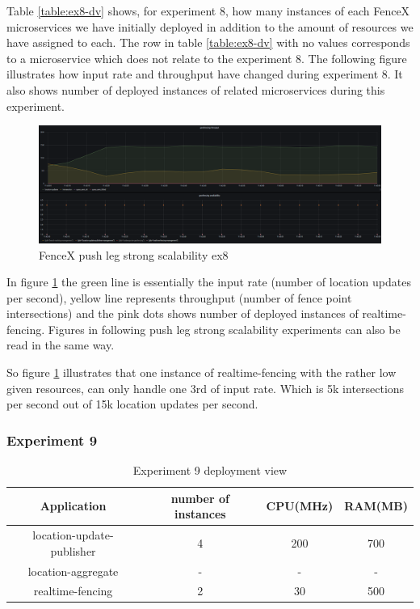 \documentclass[a4]{report}
\begin{document}
    Table \ref{table:ex8-dv} shows, for experiment 8, how many instances of each FenceX microservices we have initially
    deployed in addition to the amount of resources we have assigned to each.
    The row in table \ref{table:ex8-dv} with no values corresponds to a microservice which does not relate to the
    experiment 8.
    The following figure illustrates how input rate and throughput have changed during experiment 8.
    It also shows number of deployed instances of related microservices during this experiment.

    \begin{figure}[h!]
        \centering
        \caption{FenceX push leg strong scalability ex8}
        \label{fig:ex8}
        \includegraphics[width=\linewidth, scale=2]{images/evaluation/ex8-benchmarking-ongoing-2per4sec.png}
    \end{figure}

    In figure \ref{fig:ex8} the green line is essentially the input rate (number of location updates per second),
    yellow line represents throughput (number of fence point intersections) and the pink dots shows number of
    deployed instances of realtime-fencing.
    Figures in following push leg strong scalability experiments can also be read in the same way.

    So figure \ref{fig:ex8} illustrates that one instance of realtime-fencing with the rather low given resources, can
    only handle one 3rd of input rate.
    Which is 5k intersections per second out of 15k location updates per second.

    \clearpage

    \subsubsection{Experiment 9}
    \begin{table}[h!]
        \centering
        \begin{tabular}{|c|c|c|c|}
            \hline
            Application               & number of instances & CPU(MHz) & RAM(MB) \\
            \hline
            location-update-publisher & 4                   & 200      & 700     \\
            location-aggregate        & -                   & -        & -       \\
            realtime-fencing          & 2                   & 30       & 500     \\
            \hline
        \end{tabular}
        \caption{Experiment 9 deployment view}
        \label{table:ex9-dv}
    \end{table}
\end{document}
